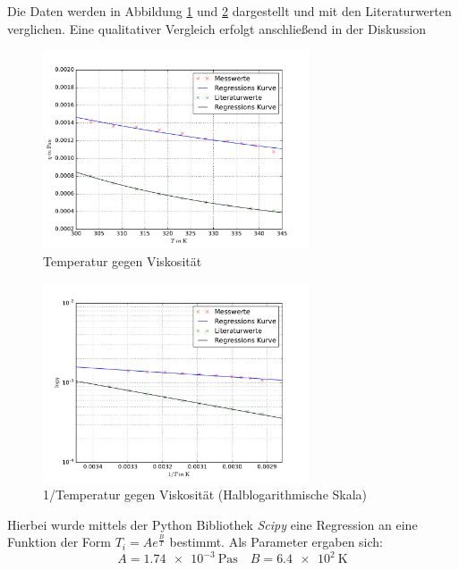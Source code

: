 Die Daten werden in Abbildung \ref{fig:t_v_v} und \ref{fig:t_v_l_v} dargestellt und mit den Literaturwerten verglichen. Eine qualitativer Vergleich erfolgt anschließend in der Diskussion
\FloatBarrier
\begin{figure}
\centering
\includegraphics[width=0.7\textwidth]{pics/viskositaet_temp_mit_lit.pdf}
\caption{Temperatur gegen Viskosität}
\label{fig:t_v_v}
\end{figure}

\begin{figure}
\centering
\includegraphics[width=0.7\textwidth]{pics/viskositaet_temp__log_mit_lit.pdf}
\caption{1/Temperatur gegen Viskosität (Halblogarithmische Skala)} %
\label{fig:t_v_l_v}
\end{figure}
\FloatBarrier

Hierbei wurde mittels der Python Bibliothek \emph{Scipy} eine %
Regression an eine Funktion der Form $T_i = Ae^{\frac{B}{T}}$ bestimmt.
Als Parameter ergaben sich:
\begin{equation*}
A=\SI{1.74e-3}{\pascal\second}\quad B=\SI{6.4e2}{\kelvin} %
\end{equation*}

